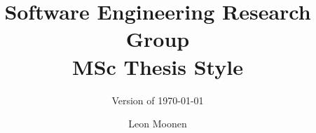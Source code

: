 \documentclass[twoside,a4paper,11pt]{memoir}
\title{Software Engineering Research Group \\MSc Thesis Style}
\subtitle{Version of \today}
\author{Leon Moonen}                               %
\begin{document}
\frontmatter
\thispagestyle{empty}
\maketitle                                      %
\makeformaltitlepages{}         %



\cleardoublepage\tableofcontents
\cleardoublepage\listoffigures
\cleardoublepage\mainmatter

 
 
 
 




\appendix
\def\chaptername{Appendix}


\end{document}
